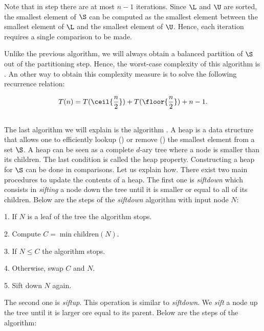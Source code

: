 Note that in step  there are at most \(n - 1\) iterations. Since \(\L\)
and \(\U\) are sorted, the smallest element of \(\S\) can be computed as the
smallest element between the smallest element of \(\L\) and the smallest
element of \(\U\). Hence, each iteration requires a single comparison to be
made.

Unlike the previous algorithm, we will always obtain a balanced partition of
\(\S\) out of the partitioning step. Hence, the worst-case complexity of this
algorithm is . An other way to obtain this complexity measure
is to solve the following recurrence relation:

\begin{displaymath}
T(n) = T(\ceil{\frac{n}{2}}) + T(\floor{\frac{n}{2}}) + n - 1.
\end{displaymath}

\subsection*{\heapsort}

The last algorithm we will explain is the \heapsort algorithm
\cite{williams:1964}. A heap is a data structure that allows one to
efficiently lookup () or remove () the smallest element
from a set \(\S\). A heap can be seen as a complete \(d\)-ary tree where a node
is smaller than its children. The last condition is called the heap property.
Constructing a heap for \(\S\) can be done in  comparisons.  Let us
explain how. There exist two main procedures to update the contents of a heap.
The first one is \emph{siftdown} which consists in \emph{sifting} a node down
the tree until it is smaller or equal to all of its children. Below are the
steps of the \emph{siftdown} algorithm with input node \(N\):

\begin{algorithm}
\item[1.] If \(N\) is a leaf of the tree the algorithm stops.
\item[2.] Compute \(C = \min \text{children}(N)\).
\item[3.] If \(N \le C\) the algorithm stops.
\item[4.] Otherwise, swap \(C\) and \(N\).
\item[5.] Sift down \(N\) again.
\end{algorithm}

The second one is \emph{siftup}. This operation is similar to \emph{siftdown}.
We \emph{sift} a node up the tree until it is larger ore equal to its parent.
Below are the steps of the algorithm:

